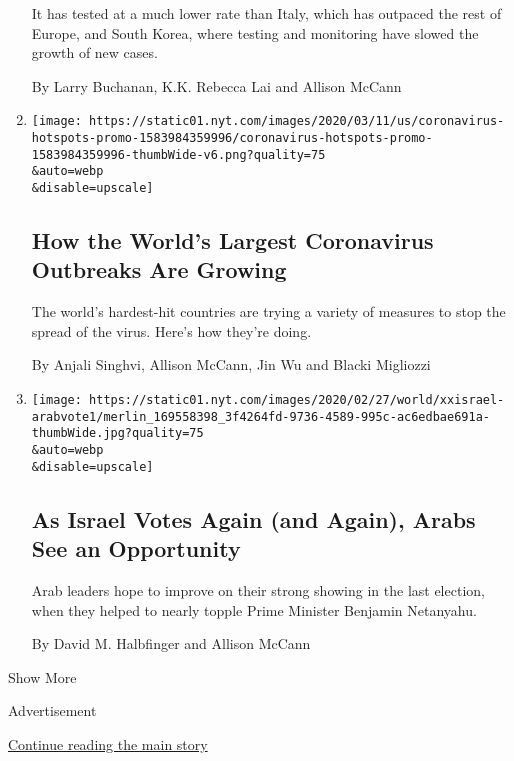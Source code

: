 \begin{enumerate}
  It has tested at a much lower rate than Italy, which has outpaced the
  rest of Europe, and South Korea, where testing and monitoring have
  slowed the growth of new cases.

  By Larry Buchanan, K.K. Rebecca Lai and Allison McCann
\item
  \href{/interactive/2020/world/coronavirus-maps-italy-iran-korea.html}{}

  \texttt{[image: https://static01.nyt.com/images/2020/03/11/us/coronavirus-hotspots-promo-1583984359996/coronavirus-hotspots-promo-1583984359996-thumbWide-v6.png?quality=75\\\&auto=webp\\\&disable=upscale]}

  \hypertarget{how-the-worlds-largest-coronavirus-outbreaks-are-growing}{%
  \subsection{How the World's Largest Coronavirus Outbreaks Are
  Growing}\label{how-the-worlds-largest-coronavirus-outbreaks-are-growing}}

  The world's hardest-hit countries are trying a variety of measures to
  stop the spread of the virus. Here's how they're doing.

  By Anjali Singhvi, Allison McCann, Jin Wu and Blacki Migliozzi
\item
  \href{/2020/02/28/world/middleeast/israel-arabs-election-vote.html}{}

  \texttt{[image: https://static01.nyt.com/images/2020/02/27/world/xxisrael-arabvote1/merlin\_169558398\_3f4264fd-9736-4589-995c-ac6edbae691a-thumbWide.jpg?quality=75\\\&auto=webp\\\&disable=upscale]}

  \hypertarget{as-israel-votes-again-and-again-arabs-see-an-opportunity}{%
  \subsection{As Israel Votes Again (and Again), Arabs See an
  Opportunity}\label{as-israel-votes-again-and-again-arabs-see-an-opportunity}}

  Arab leaders hope to improve on their strong showing in the last
  election, when they helped to nearly topple Prime Minister Benjamin
  Netanyahu.

  By David M. Halbfinger and Allison McCann
\end{enumerate}

Show More

Advertisement

\protect\hyperlink{after-mid2}{Continue reading the main story}

